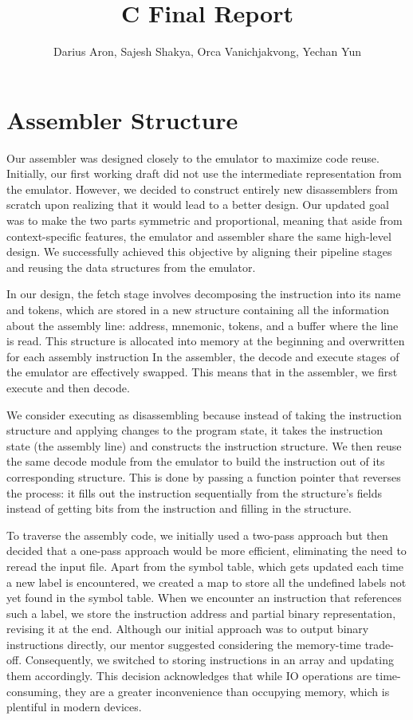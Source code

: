 \documentclass{article}
\title{C Final Report}
\author{Darius Aron, Sajesh Shakya, Orca Vanichjakvong, Yechan Yun}
\begin{document}
\maketitle

\section{Assembler Structure}

Our assembler was designed closely to the emulator to maximize code reuse. Initially, our first working draft did not use the intermediate representation from the emulator. However, we decided to construct entirely new disassemblers from scratch upon realizing that it would lead to a better design. Our updated goal was to make the two parts symmetric and proportional, meaning that aside from context-specific features, the emulator and assembler share the same high-level design. We successfully achieved this objective by aligning their pipeline stages and reusing the data structures from the emulator.

In our design, the fetch stage involves decomposing the instruction into its name and tokens, which are stored in a new structure containing all the information about the assembly line: address, mnemonic, tokens, and a buffer where the line is read. This structure is allocated into memory at the beginning and overwritten for each assembly instruction In the assembler, the decode and execute stages of the emulator are effectively swapped. This means that in the assembler, we first execute and then decode.

We consider executing as disassembling because instead of taking the instruction structure and applying changes to the program state, it takes the instruction state (the assembly line) and constructs the instruction structure. We then reuse the same decode module from the emulator to build the instruction out of its corresponding structure. This is done by passing a function pointer that reverses the process: it fills out the instruction sequentially from the structure's fields instead of getting bits from the instruction and filling in the structure.

To traverse the assembly code, we initially used a two-pass approach but then decided that a one-pass approach would be more efficient, eliminating the need to reread the input file. Apart from the symbol table, which gets updated each time a new label is encountered, we created a map to store all the undefined labels not yet found in the symbol table. When we encounter an instruction that references such a label, we store the instruction address and partial binary representation, revising it at the end. Although our initial approach was to output binary instructions directly, our mentor suggested considering the memory-time trade-off. Consequently, we switched to storing instructions in an array and updating them accordingly. This decision acknowledges that while IO operations are time-consuming, they are a greater inconvenience than occupying memory, which is plentiful in modern devices.
\end{document}
